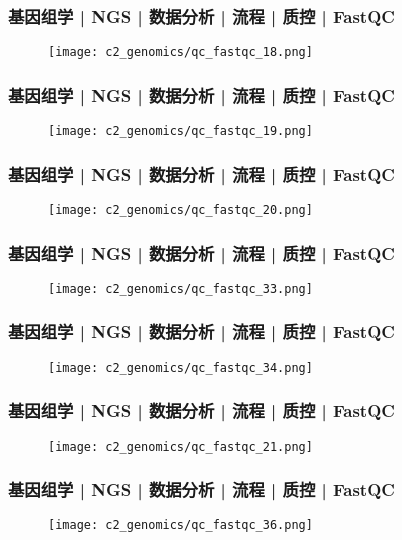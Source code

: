 \begin{frame}
  \frametitle{基因组学 | NGS | 数据分析 | 流程 | 质控 | FastQC}
  \begin{figure}
    \centering
    \texttt{[image: c2\_genomics/qc\_fastqc\_18.png]}
  \end{figure}
\end{frame}

\begin{frame}
  \frametitle{基因组学 | NGS | 数据分析 | 流程 | 质控 | FastQC}
  \begin{figure}
    \centering
    \texttt{[image: c2\_genomics/qc\_fastqc\_19.png]}
  \end{figure}
\end{frame}

\begin{frame}
  \frametitle{基因组学 | NGS | 数据分析 | 流程 | 质控 | FastQC}
  \begin{figure}
    \centering
    \texttt{[image: c2\_genomics/qc\_fastqc\_20.png]}
  \end{figure}
\end{frame}

\begin{frame}
  \frametitle{基因组学 | NGS | 数据分析 | 流程 | 质控 | FastQC}
  \begin{figure}
    \centering
    \texttt{[image: c2\_genomics/qc\_fastqc\_33.png]}
  \end{figure}
\end{frame}

\begin{frame}
  \frametitle{基因组学 | NGS | 数据分析 | 流程 | 质控 | FastQC}
  \begin{figure}
    \centering
    \texttt{[image: c2\_genomics/qc\_fastqc\_34.png]}
  \end{figure}
\end{frame}

\begin{frame}
  \frametitle{基因组学 | NGS | 数据分析 | 流程 | 质控 | FastQC}
  \begin{figure}
    \centering
    \texttt{[image: c2\_genomics/qc\_fastqc\_21.png]}
  \end{figure}
\end{frame}

\begin{frame}
  \frametitle{基因组学 | NGS | 数据分析 | 流程 | 质控 | FastQC}
  \begin{figure}
    \centering
    \texttt{[image: c2\_genomics/qc\_fastqc\_36.png]}
  \end{figure}
\end{frame}

